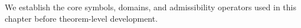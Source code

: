 We establish the core symbols, domains, and admissibility operators used in this chapter before theorem-level development.
